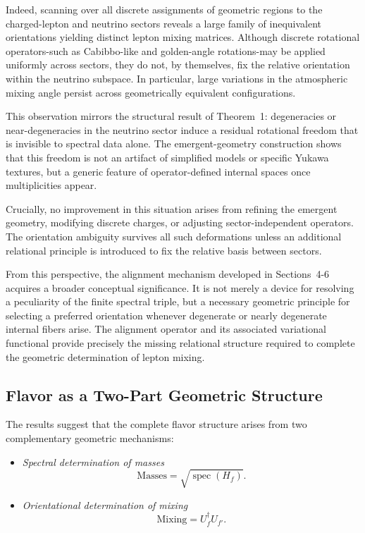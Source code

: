 Indeed, scanning over all discrete assignments of geometric regions to the charged-lepton and neutrino sectors reveals a large family of inequivalent orientations yielding distinct lepton mixing matrices. Although discrete rotational operators-such as Cabibbo-like and golden-angle rotations-may be applied uniformly across sectors, they do not, by themselves, fix the relative orientation within the neutrino subspace. In particular, large variations in the atmospheric mixing angle persist across geometrically equivalent configurations.

This observation mirrors the structural result of Theorem~1: degeneracies or near-degeneracies in the neutrino sector induce a residual rotational freedom that is invisible to spectral data alone. The emergent-geometry construction shows that this freedom is not an artifact of simplified models or specific Yukawa textures, but a generic feature of operator-defined internal spaces once multiplicities appear.

Crucially, no improvement in this situation arises from refining the emergent geometry, modifying discrete charges, or adjusting sector-independent operators. The orientation ambiguity survives all such deformations unless an additional relational principle is introduced to fix the relative basis between sectors.

From this perspective, the alignment mechanism developed in Sections~4-6 acquires a broader conceptual significance. It is not merely a device for resolving a peculiarity of the finite spectral triple, but a necessary geometric principle for selecting a preferred orientation whenever degenerate or nearly degenerate internal fibers arise. The alignment operator and its associated variational functional provide precisely the missing relational structure required to complete the geometric determination of lepton mixing.

\subsection{Flavor as a Two-Part Geometric Structure}

The results suggest that the complete flavor structure arises from two complementary geometric mechanisms:

\begin{itemize}
\item \emph{Spectral determination of masses}
\[
\text{Masses} = \sqrt{\operatorname{spec}(H_f)}.
\]

\item \emph{Orientational determination of mixing}
\[
\text{Mixing} = U_f^\dagger U_{f'}.
\]
\end{itemize}

